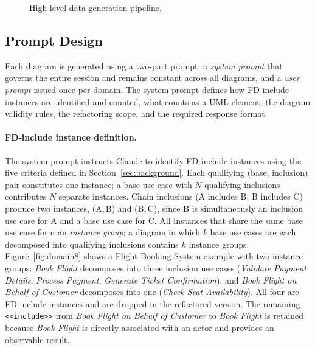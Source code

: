 \documentclass[12pt, a4paper]{article}
\begin{document}
\begin{figure}[h]
\centering
{}
\caption{High-level data generation pipeline.}
\label{fig:pipeline}
\end{figure}

\subsection{Prompt Design}
\label{sec:prompt}

Each diagram is generated using a two-part prompt: a \emph{system prompt}
that governs the entire session and remains constant across all diagrams,
and a \emph{user prompt} issued once per domain.  The system prompt
defines how FD-include instances are identified and counted, what counts
as a UML element, the diagram validity rules, the refactoring scope,
and the required response format.

\paragraph{FD-include instance definition.}
The system prompt instructs Claude to identify FD-include instances using
the five criteria defined in Section~\ref{sec:background}.
Each qualifying (base, inclusion) pair constitutes one instance; a base
use case with $N$ qualifying inclusions contributes $N$ separate instances.
Chain inclusions (A includes B, B includes C) produce two instances,
(A,\,B) and (B,\,C), since B is simultaneously an inclusion use case for A
and a base use case for C.  All instances that share the same base use case
form an \emph{instance group}; a diagram in which $k$ base use cases are
each decomposed into qualifying inclusions contains $k$ instance groups.
Figure~\ref{fig:domain8} shows a Flight Booking System example with two instance groups: \textit{Book Flight} decomposes into three inclusion use cases (\textit{Validate Payment Details}, \textit{Process Payment}, \textit{Generate Ticket Confirmation}), and \textit{Book Flight on Behalf of Customer} decomposes into one (\textit{Check Seat Availability}).  All four are FD-include instances and are dropped in the refactored version.  The remaining \texttt{<<include>>} from \textit{Book Flight on Behalf of Customer} to \textit{Book Flight} is retained because \textit{Book Flight} is directly associated with an actor and provides an observable result.
\end{document}
